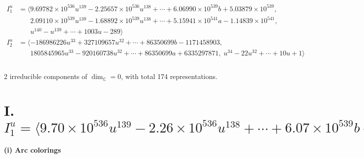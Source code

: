\documentclass[1p]{elsarticle_modified}
\theoremstyle{definition}
\begin{document}
\begin{align*}
I^u_{1}&=\langle 
9.69782\times10^{536} u^{139}-2.25657\times10^{536} u^{138}+\cdots+6.06990\times10^{539} b+5.03879\times10^{539},\\
\phantom{I^u_{1}}&\phantom{= \langle  }2.09110\times10^{539} u^{139}-1.68892\times10^{539} u^{138}+\cdots+5.15941\times10^{541} a-1.14839\times10^{541},\\
\phantom{I^u_{1}}&\phantom{= \langle  }u^{140}- u^{139}+\cdots+1003 u-289\rangle \\
I^u_{2}&=\langle 
-186986226 u^{33}+327109657 u^{32}+\cdots+86350699 b-1171458903,\\
\phantom{I^u_{2}}&\phantom{= \langle  }1805845965 u^{33}-920160738 u^{32}+\cdots+86350699 a+6335297871,\;u^{34}-22 u^{32}+\cdots+10 u+1\rangle \\
\\
\end{align*}
\raggedright * 2 irreducible components of $\dim_{\mathbb{C}}=0$, with total 174 representations.\\
\newpage
\renewcommand{\arraystretch}{1}
\centering \section*{I. $I^u_{1}= \langle 9.70\times10^{536} u^{139}-2.26\times10^{536} u^{138}+\cdots+6.07\times10^{539} b+5.04\times10^{539},\;2.09\times10^{539} u^{139}-1.69\times10^{539} u^{138}+\cdots+5.16\times10^{541} a-1.15\times10^{541},\;u^{140}- u^{139}+\cdots+1003 u-289 \rangle$}
\flushleft \textbf{(i) Arc colorings}\\
\end{document}
